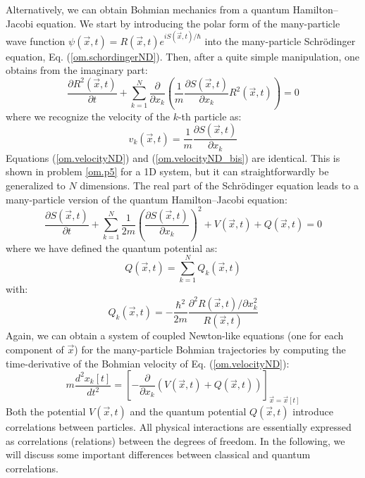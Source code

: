 \documentclass[nofootinbib, secnumarabic, amsmath, nobibnotes,10pt,aps,pra]{revtex4-1}
\newcommand{\eref}[1]{Eq. (\ref{#1})}
\begin{document}
Alternatively, we can obtain Bohmian mechanics from a quantum Hamilton--Jacobi equation. We start by introducing the polar form of the many-particle wave function $\psi(\vec{x},t) = R(\vec{x},t) e^{i S(\vec{x},t)/\hbar}$ into the many-particle Schr\"odinger equation, \eref{om.schordingerND}. Then, after a quite simple manipulation, one obtains from the imaginary part:
\begin{equation}
\label{om.charge_conservationND}
\frac{\partial R^{2}(\vec{x},t)}{\partial t} + \sum_{k = 1}^{N} \frac {\partial } {\partial x_k} \left(\frac {1} {m} \frac {\partial S(\vec{x},t)}{\partial x_k} R^2(\vec{x},t) \right) = 0
\end{equation}
where we recognize the velocity of the $k$-th particle as:
\begin{equation}
\label{om.velocityND_bis}
v_k(\vec{x},t) = \frac {1} {m} \frac {\partial S(\vec{x},t)}{\partial x_k}
\end{equation}
Equations (\ref{om.velocityND}) and (\ref{om.velocityND_bis}) are
identical. This is shown in problem \ref{om.p5} for a 1D system, but
it can straightforwardly be generalized to $N$ dimensions. The real
part of the Schr\"odinger equation leads to a many-particle version
of the quantum Hamilton--Jacobi equation:
\begin{equation}
\label{om.Hamilton_JacobiND}
\frac{\partial S(\vec{x},t)}{\partial t} + \sum_{k = 1}^{N} \frac {1} {2 m} \left(\frac{{\partial} S(\vec{x},t)} {\partial x_k} \right)^2 + V(\vec{x},t) + Q(\vec{x},t) = 0 
\end{equation}
where we have defined the quantum potential as:
\begin{equation}
\label{om.quantum_potentialND_total}
Q(\vec{x},t) = \sum_{k = 1}^{N} Q_k(\vec{x},t)
\end{equation}
with:
\begin{equation}
\label{om.quantum_potentialND_parcial}
Q_k(\vec{x},t) = -\frac{\hbar^2} {2 m} \frac{{\partial}^2 R(\vec{x},t)/ \partial x^2_k} {R(\vec{x},t)}
\end{equation}
Again, we can obtain a system of coupled Newton-like equations (one for each component of $\vec{x}$) for the many-particle Bohmian trajectories by computing the time-derivative of the Bohmian velocity of \eref{om.velocityND}:
\begin{equation}
\label{om.NewtonlikeMP}
m\frac{d^2x_k[t]} {dt^2} = \left [-\frac{\partial} {\partial x_k} \left( V(\vec{x},t) + Q(\vec{x},t)\right)  \right ] _{\vec x = \vec x[t]}
\end{equation}
Both the potential $V(\vec{x},t)$ and the quantum potential
$Q(\vec{x},t)$ introduce correlations between particles. All
physical interactions are essentially expressed as correlations (relations)
between the degrees of freedom. In the following, we will discuss
some important differences between classical and quantum
correlations.
\end{document}
